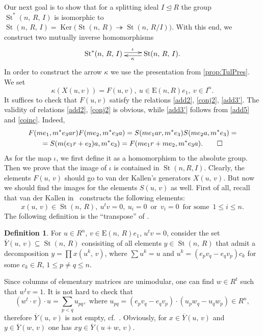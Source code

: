 \documentclass[11pt]{amsart}
\theoremstyle{plain} \declaretheorem[name=Theorem, Refname={Theorem,Theorems}]{tm} \Crefname{tm}{Theorem}{Theorems}
\numberwithin{equation}{section}
\theoremstyle{definition} \newtheorem{df}[lm]{Definition} \Crefname{df}{Definition}{Definitions}
\theoremstyle{remark} \newtheorem{rk}[lm]{Remark} \Crefname{rk}{Remark}{Remarks}
\newcommand{\Ker}{\mathop{\mathrm{Ker}}\nolimits}
\newcommand{\E}{{\mathrm{E}}}
\newcommand{\St}{\mathop{\mathrm{St}}\nolimits}
\newcommand{\epi}{\twoheadrightarrow}
\begin{document}
Our next goal is to show that for a splitting ideal $I\trianglelefteq R$ the group $\St^*(n,\,R,\,I)$ is isomorphic to $\St(n,\,R,\,I)=\Ker\big(\St(n,\,R)\epi\St(n,\,R/I)\big)$.
With this end, we construct two mutually inverse homomorphisms
$$\xymatrix{\St^*(n,\,R,\,I)\ar@<0.5ex>[r]^{\iota}&\St(n,\,R,\,I)\ar@<0.5ex>[l]^{\kappa}.}$$
In order to construct the arrow $\kappa$ we use the presentation from \cref{prop:TulPres}.
We set $$\kappa(X(u,v)) = F(u,v),\ u\in \E(n, R)e_1,\ v\in I^n.$$ 
It suffices to check that $F(u,v)$ satisfy the relations \eqref{add2}, \eqref{conj2}, \eqref{add3'}.
The validity of relations \eqref{add2}, \eqref{conj2} is obvious, while \eqref{add3'} follows from \eqref{add5} and \eqref{coinc}. Indeed,
\begin{multline} F(me_1, m^*e_3ar) F(me_2, m^*e_3a) = S(me_1ar, m^*e_3) S(me_2a, m^*e_3) = \\ = S(m(e_1r+e_2)a, m^*e_3) = F(me_1r+me_2, m^*e_3a). \qedhere \end{multline}
As for the map $\iota$, we first define it as a homomorphism to the absolute group. %
Then we prove that the image of $\iota$ is contained in $\St(n, R, I)$.
Clearly, the elements $F(u,\,v)$ should go to van der Kallen's generators $X(u,\,v)$.
But now we should find the images for the elements $S(u,\,v)$ as well.
First of all, recall that van der Kallen in~\cite[3.8--3.10]{vdK} constructs the following elements:
$$x(u,\,v)\in\St(n,\,R),\ u^tv=0,\ u_i=0\,\text{ or }\,v_i=0\,\text{ for some }\,1\leq i\leq n.$$
The following definition is the ``transpose'' of \cite[3.13]{vdK}.
\begin{df} For $u\in R^n$, $v\in\E(n,\,R)e_1$, $u^tv=0$, consider the set $\overline Y(u,\,v)\subseteq\St(n,\,R)$
 consisiting of all elements $y\in\St(n,\,R)$ that admit a decomposition $y=\prod x(u^k,\,v)$, 
 where $\sum u^k=u$ and $u^k= (e_pv_q-e_qv_p)c_k$ for some $c_k\in R$, $1\leq p\neq q\leq n$. \end{df}

Since columns of elementary matrices are unimodular, one can find $w\in R^t$ such that $w^tv=1$.
It is not hard to check that \setcounter{equation}{6} \setcounter{lm}{7}
\begin{equation} (w^t\cdot v)\cdot u = \sum_{p<q}u_{pq},\text{ where }u_{pq} = (e_pv_q - e_qv_p)\cdot  (u_pw_q - u_qw_p)\in{}\!R^n, \label{eq:canonical}\end{equation}
therefore $\overline Y(u,\,v)$ is not empty, cf.~\cite[3.1--3.2]{vdK}.
Obviously, for $x\in\overline Y(u,\,v)$ and $y\in\overline Y(w,\,v)$ one has $xy\in\overline Y(u+w,\,v)$.
\end{document}
